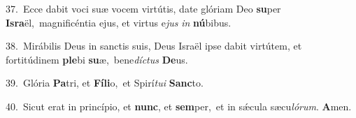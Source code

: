 {\numbfont\textcolor{\numbcolor}{37.}}~Ecce dabit voci suæ vocem virtútis, date glóriam Deo \textbf{su}\-per \textbf{Is}\-\textbf{ra}ël,~\star magnificéntia ejus, et virtus e\textit{jus} \textit{in} \textbf{nú}\-bibus.\par
{\numbfont\textcolor{\numbcolor}{38.}}~Mirábilis Deus in sanctis suis, Deus Israël ipse dabit virtútem, et fortitúdinem \textbf{ple}\-bi \textbf{su}\-æ,~\star bene\-\textit{díc}\-\textit{tus} \textbf{De}\-us.\par
{\numbfont\textcolor{\numbcolor}{39.}}~Glória \textbf{Pa}\-tri, et \textbf{Fí}\-\textbf{li}o,~\star et Spirí\-\textit{tu}\-\textit{i} \textbf{Sanc}\-to.\par
{\numbfont\textcolor{\numbcolor}{40.}}~Sicut erat in princípio, et \textbf{nunc}\-, et \textbf{sem}\-per,~\star et in sǽcula sæcu\-\textit{ló}\-\textit{rum}. \textbf{A}\-men.\par
